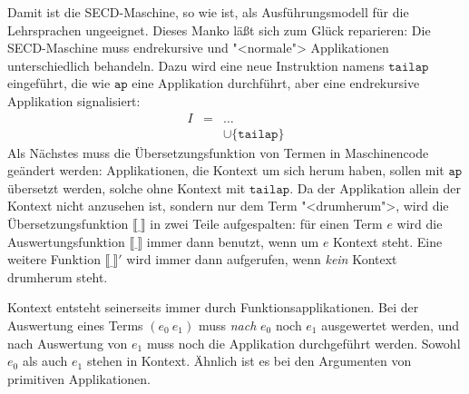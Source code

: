 %
Damit ist die SECD-Maschine, so wie ist, als Ausführungsmodell für
die Lehrsprachen ungeeignet.  Dieses Manko läßt sich zum Glück reparieren: Die
SECD-Maschine muss endrekursive und "<normale"> Applikationen
unterschiedlich behandeln.  Dazu wird eine neue Instruktion namens
$\mathtt{tailap}$ eingeführt, die wie $\mathtt{ap}$ eine Applikation
durchführt, aber eine endrekursive Applikation signalisiert:
%
\begin{eqnarray*}
  I &=& \ldots\\
  &&\cup \{ \mathtt{tailap} \}
\end{eqnarray*}
%
Als Nächstes muss die Übersetzungsfunktion von Termen in Maschinencode
geändert werden:  Applikationen, die Kontext um sich herum haben,
sollen mit $\mathtt{ap}$ übersetzt werden, solche ohne Kontext mit
$\mathtt{tailap}$.  Da der Applikation allein der Kontext nicht
anzusehen ist, sondern nur dem Term "<drumherum">, wird die
Übersetzungsfunktion $\llbracket \underline{~} \rrbracket$ in zwei
Teile aufgespalten: für einen Term $e$ wird die Auswertungsfunktion $\llbracket\underline{~}\rrbracket$ immer dann benutzt, wenn um $e$ Kontext steht.  Eine
weitere Funktion $\llbracket \underline{~} \rrbracket'$ wird immer
dann aufgerufen, wenn \emph{kein} Kontext drumherum steht.

Kontext entsteht seinerseits immer durch Funktionsapplikationen.  Bei
der Auswertung eines Terms $(e_0~e_1)$ muss \emph{nach} $e_0$ noch
$e_1$ ausgewertet werden, und nach Auswertung von $e_1$ muss noch die
Applikation durchgeführt werden.  Sowohl $e_0$ als auch $e_1$ stehen
in Kontext.  Ähnlich ist es bei den Argumenten von primitiven
Applikationen.

